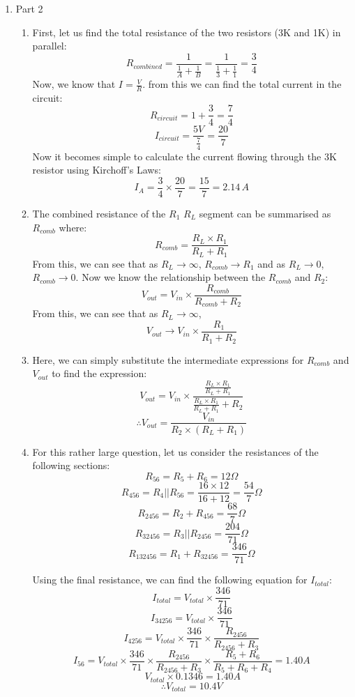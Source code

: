 \documentclass{article}
\begin{document}
\begin{enumerate}
\begin{enumerate}[label*=\arabic*.]
\item 

 \end{enumerate}
 \item Part 2
 \begin{enumerate}[label*=\arabic*.]
 	\item First, let us find the total resistance of the two resistors (3K and 1K) in parallel:
	\[ R_{combined} = \frac{1}{\frac{1}{A}+\frac{1}{B}} = \frac{1}{\frac{1}{3}+\frac{1}{1}} = \frac{3}{4}\]
	Now, we know that $I = \frac{V}{R}$. from this we can find the total current in the circuit:
	\[ R_{circuit} = 1 + \frac{3}{4} = \frac{7}{4}\]
	\[ I_{circuit} = \frac{5V}{\frac{7}{4}} = \frac{20}{7} \]
	Now it becomes simple to calculate the current flowing through the 3K resistor using Kirchoff's Laws:
	\begin{equation}
	I_A = \frac{3}{4} \times \frac{20}{7} = \frac{15}{7} = 2.14\,A
	\end{equation}
	
	\item The combined resistance of the $R_1$ $R_L$ segment can be summarised as $R_{comb}$ where:
	\[R_{comb} = \frac{R_L \times R_1}{R_L + R_1}\]
	From this, we can see that as $R_L \to \infty$, $R_{comb} \to R_1$ and as $R_L \to 0$, $R_{comb} \to 0$. Now we know the relationship between the $R_{comb}$ and $R_2$: 
	\begin{equation}
	V_{out} = V_{in} \times \frac{R_{comb}}{R_{comb}+R_2}
	\end{equation}
	From this, we can see that as $R_L \to \infty$,
	\[V_{out} \to V_{in} \times \frac{R_1}{R_1+R_2} \]
	
	\item Here, we can simply substitute the intermediate expressions for $R_{comb}$ and $V_{out}$  to find the expression:
	\[V_{out} = V_{in} \times \frac{\frac{R_L \times R_1}{R_L + R_1}}{\frac{R_L \times R_1}{R_L + R_1}+R_2} \]
	\[\therefore V_{out} = \frac{V_{in}}{R_2 \times (R_L+R_1)} \]
	
	\item For this rather large question, let us consider the resistances of the following sections:
	\[R_{56} = R_5+R_6 = 12 \Omega \]
	\[R_{456} = R_4 || R_{56} = \frac{16 \times 12}{16+12} = \frac{54}{7} \Omega \]
	\[R_{2456} = R_2 + R_{456} = \frac{68}{7} \Omega \]
	\[R_{32456} = R_3 || R_{2456} = \frac{204}{71} \Omega \]
	\[R_{132456} = R_1 + R_{32456} = \frac{346}{71} \Omega \]
	
	Using the final resistance, we can find the following equation for $I_{total}$:
	\[I_{total} = V_{total} \times \frac{346}{71} \]
	\[I_{34256} = V_{total} \times \frac{346}{71} \]
	\[I_{4256} =  V_{total} \times \frac{346}{71} \times \frac{R_{2456}}{R_{2456}+R_3} \]
	\[I_{56} = V_{total} \times \frac{346}{71} \times \frac{R_{2456}}{R_{2456}+R_3} \times \frac{R_5+R_6}{R_5+R_6+R_4} = 1.40 A \]
	\[\ V_{total} \times 0.1346 = 1.40 A \]
	\[ \therefore  V_{total} = 10.4 V \]
	

\end{enumerate}
\end{enumerate}
\end{document}
